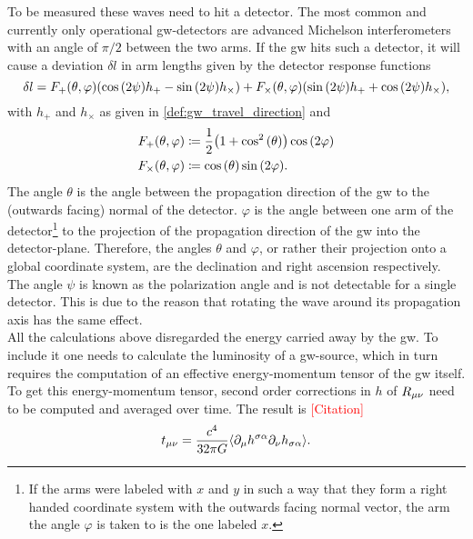 To be measured these waves need to hit a detector. The most common and currently only operational \gls{gw}-detectors are advanced Michelson interferometers with an angle of $\pi/2$ between the two arms. If the \gls{gw} hits such a detector, it will cause a deviation $\delta l$ in arm lengths given by the detector response functions
\begin{equation}\label{def:detector_response}
\delta l = F_+{\left( \theta, \varphi \right)}{\left( \cos{\left( 2\psi \right)}h_+ - \sin{\left( 2\psi \right)} h_\times \right)} + F_\times{\left( \theta, \varphi \right)}{\left( \sin{\left( 2\psi \right)}h_+ + \cos{\left( 2\psi \right)} h_\times \right)},
\end{equation}
with $h_+$ and $h_\times$ as given in \eqref{def:gw_travel_direction} and
\begin{align}
F_+{\left( \theta, \varphi \right)} &\coloneqq \frac{1}{2}{\left( 1+\cos^2{\left( \theta \right)} \right)}\cos{\left( 2\varphi \right)}\nonumber\\
F_\times{\left( \theta, \varphi \right)} &\coloneqq\cos{\left( \theta \right)}\sin{\left( 2\varphi \right)}.
\end{align}
The angle $\theta$ is the angle between the propagation direction of the \gls{gw} to the (outwards facing) normal of the detector. $\varphi$ is the angle between one arm of the detector\footnote{If the arms were labeled with $x$ and $y$ in such a way that they form a right handed coordinate system with the outwards facing normal vector, the arm the angle $\varphi$ is taken to is the one labeled $x$.} to the projection of the propagation direction of the \gls{gw} into the detector-plane. Therefore, the angles $\theta$ and $\varphi$, or rather their projection onto a global coordinate system, are the declination and right ascension respectively. The angle $\psi$ is known as the polarization angle and is not detectable for a single detector. This is due to the reason that rotating the wave around its propagation axis has the same effect.\medskip\\
All the calculations above disregarded the energy carried away by the \gls{gw}. To include it one needs to calculate the luminosity of a \gls{gw}-source, which in turn requires the computation of an effective energy-momentum tensor of the \gls{gw} itself.\\
To get this energy-momentum tensor, second order corrections in $h$ of $R_{\mu\nu}$ need to be computed and averaged over time. The result is \textcolor{red}{[Citation]}
\begin{equation}
t_{\mu\nu} = \frac{c^4}{32\pi G}\langle\partial_\mu h^{\sigma\alpha}\partial_\nu h_{\sigma\alpha}\rangle.
\end{equation}
